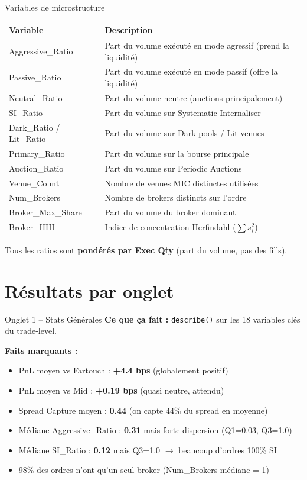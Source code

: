 \documentclass[10pt]{beamer}
\begin{document}
\begin{frame}{Variables de microstructure}
\begin{tabular}{lp{6.5cm}}
\toprule
\textbf{Variable} & \textbf{Description} \\
\midrule
Aggressive\_Ratio & Part du volume exécuté en mode agressif (prend la liquidité) \\
Passive\_Ratio & Part du volume exécuté en mode passif (offre la liquidité) \\
Neutral\_Ratio & Part du volume neutre (auctions principalement) \\
SI\_Ratio & Part du volume sur Systematic Internaliser \\
Dark\_Ratio / Lit\_Ratio & Part du volume sur Dark pools / Lit venues \\
Primary\_Ratio & Part du volume sur la bourse principale \\
Auction\_Ratio & Part du volume sur Periodic Auctions \\
Venue\_Count & Nombre de venues MIC distinctes utilisées \\
Num\_Brokers & Nombre de brokers distincts sur l'ordre \\
Broker\_Max\_Share & Part du volume du broker dominant \\
Broker\_HHI & Indice de concentration Herfindahl ($\sum s_i^2$) \\
\bottomrule
\end{tabular}

\vspace{0.2cm}
Tous les ratios sont \textbf{pondérés par Exec Qty} (part du volume, pas des fills).
\end{frame}

\section{Résultats par onglet}

\begin{frame}{Onglet 1 -- Stats Générales}
\textbf{Ce que ça fait :} \texttt{describe()} sur les 18 variables clés du trade-level.

\vspace{0.2cm}
\textbf{Faits marquants :}
\begin{itemize}
    \item PnL moyen vs Fartouch : \textbf{+4.4 bps} (globalement positif)
    \item PnL moyen vs Mid : \textbf{+0.19 bps} (quasi neutre, attendu)
    \item Spread Capture moyen : \textbf{0.44} (on capte 44\% du spread en moyenne)
    \item Médiane Aggressive\_Ratio : \textbf{0.31} mais forte dispersion (Q1=0.03, Q3=1.0)
    \item Médiane SI\_Ratio : \textbf{0.12} mais Q3=1.0 $\rightarrow$ beaucoup d'ordres 100\% SI
    \item 98\% des ordres n'ont qu'un seul broker (Num\_Brokers médiane = 1)
\end{itemize}
\end{frame}
\end{document}
